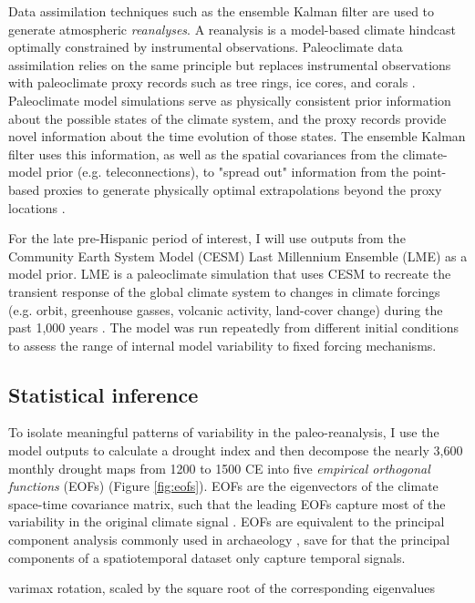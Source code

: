 \documentclass[fleqn,10pt]{wlscirep}
\begin{document}
Data assimilation techniques such as the ensemble Kalman filter are used to generate atmospheric \textit{reanalyses}. A reanalysis is a model-based climate hindcast optimally constrained by instrumental observations. Paleoclimate data assimilation relies on the same principle but replaces instrumental observations with paleoclimate proxy records such as tree rings, ice cores, and corals \cite{Hakim2016TheResults}. Paleoclimate model simulations serve as physically consistent prior information about the possible states of the climate system, and the proxy records provide novel information about the time evolution of those states. The ensemble Kalman filter uses this information, as well as the spatial covariances from the climate-model prior (e.g. teleconnections), to "spread out" information from the point-based proxies to generate physically optimal extrapolations beyond the proxy locations \cite{Acevedo2015TowardsTechniques,Hakim2016TheResults}.

For the late pre-Hispanic period of interest, I will use outputs from the Community Earth System Model (CESM) Last Millennium Ensemble (LME) as a model prior. LME is a paleoclimate simulation that uses CESM to recreate the transient response of the global climate system to changes in climate forcings (e.g. orbit, greenhouse gasses, volcanic activity, land-cover change) during the past 1,000 years \cite{Otto-bliesner2015}. The model was run repeatedly from different initial conditions to assess the range of internal model variability to fixed forcing mechanisms.

\subsection*{Statistical inference}

To isolate meaningful patterns of variability in the paleo-reanalysis, I use the model outputs to calculate a drought index and then decompose the nearly 3,600 monthly drought maps from 1200 to 1500 CE into five \textit{empirical orthogonal functions} (EOFs) (Figure \ref{fig:eofs}). EOFs are the eigenvectors of the climate space-time covariance matrix, such that the leading EOFs capture most of the variability in the original climate signal \cite{Lorenz1956EmpiricalPrediction}. EOFs are equivalent to the principal component analysis commonly used in archaeology \cite[e.g.]{Dean1996DemographyStress}, save for that the principal components of a spatiotemporal dataset only capture temporal signals.

varimax rotation, scaled by the square root of the corresponding eigenvalues
\end{document}
